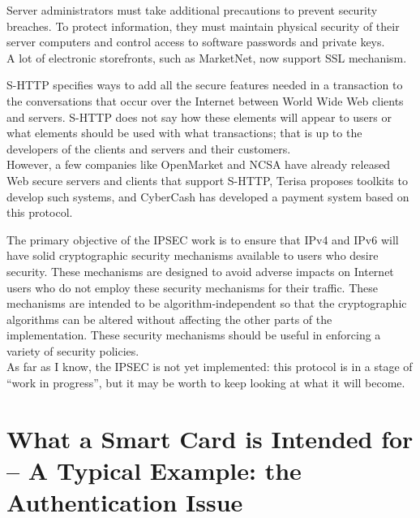 \begin{htmllist}
    Server administrators must take additional precautions to prevent
    security breaches. To protect information, they must maintain physical
    security of their server computers and control access to software
    passwords and private keys.\\
    
    A lot of electronic storefronts, such as MarketNet, now support SSL
    mechanism.

    
    S-HTTP specifies ways to add all the secure features needed in a
    transaction to the conversations that occur over the Internet between
    World Wide Web clients and servers. S-HTTP does not say how these
    elements will appear to users or what elements should be used with what
    transactions; that is up to the developers of the clients and servers
    and their customers.\\
    
    However, a few companies like OpenMarket and NCSA have already released
    Web secure servers and clients that support S-HTTP, Terisa proposes
    toolkits to develop such systems, and CyberCash has developed a payment
    system based on this protocol.


    
    The primary objective of the IPSEC work is to ensure that IPv4 and IPv6
    will have solid cryptographic security mechanisms available to users
    who desire security. These mechanisms are designed to avoid adverse
    impacts on Internet users who do not employ these security mechanisms
    for their traffic. These mechanisms are intended to be
    algorithm-independent so that the cryptographic algorithms can be
    altered without affecting the other parts of the implementation. These
    security mechanisms should be useful in enforcing a variety of security
    policies.\\
    
    As far as I know, the IPSEC is not yet implemented: this protocol is in
    a stage of ``work in progress'', but it may be worth to keep looking at
    what it will become.
\end{htmllist}


\section{What a Smart Card is Intended for -- A Typical Example: the
  Authentication Issue}


